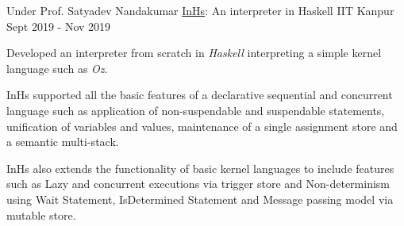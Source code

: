 

\begin{cventries}

  \cventry
    {Under Prof. Satyadev Nandakumar} %
    {\href{https://github.com/ayush268/InHs}{InHs}: An interpreter in Haskell} %
    {IIT Kanpur} %
    {Sept 2019 - Nov 2019} %
    {
      \begin{cvitems} %
      \item {Developed an interpreter from scratch in \textit{Haskell} interpreting a simple kernel language such as \textit{Oz}.}
      \item {InHs supported all the basic features of a declarative sequential and concurrent language such as application of non-suspendable and suspendable statements, unification of variables and values, maintenance of a single assignment store and a semantic multi-stack.}
      \item {InHs also extends the functionality of basic kernel languages to include features such as Lazy and concurrent executions via trigger store and Non-determinism using Wait Statement, IsDetermined Statement and Message passing model via mutable store.}
      \end{cvitems}
    }%




\end{cventries}
